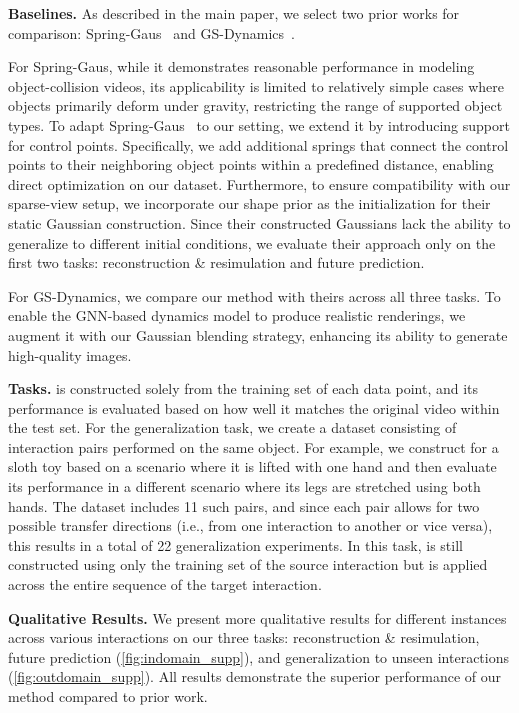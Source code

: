 \documentclass[10pt,twocolumn,letterpaper]{article}
\begin{document}
\textbf{Baselines.} As described in the main paper, we select two prior works for comparison: Spring-Gaus~\cite{zhong2024reconstruction} and GS-Dynamics~\cite{zhang2024dynamic}.  

For Spring-Gaus, while it demonstrates reasonable performance in modeling object-collision videos, its applicability is limited to relatively simple cases where objects primarily deform under gravity, restricting the range of supported object types. To adapt Spring-Gaus~\cite{zhong2024reconstruction} to our setting, we extend it by introducing support for control points. Specifically, we add additional springs that connect the control points to their neighboring object points within a predefined distance, enabling direct optimization on our dataset.  
Furthermore, to ensure compatibility with our sparse-view setup, we incorporate our shape prior as the initialization for their static Gaussian construction. Since their constructed Gaussians lack the ability to generalize to different initial conditions, we evaluate their approach only on the first two tasks: reconstruction \& resimulation and future prediction.

For GS-Dynamics, we compare our method with theirs across all three tasks.  
To enable the GNN-based dynamics model to produce realistic renderings, we augment it with our Gaussian blending strategy, enhancing its ability to generate high-quality images.  

\textbf{Tasks.} \ourabbr is constructed solely from the training set of each data point, and its performance is evaluated based on how well it matches the original video within the test set. For the generalization task, we create a dataset consisting of interaction pairs performed on the same object. For example, we construct \ourabbr for a sloth toy based on a scenario where it is lifted with one hand and then evaluate its performance in a different scenario where its legs are stretched using both hands. The dataset includes 11 such pairs, and since each pair allows for two possible transfer directions (i.e., from one interaction to another or vice versa), this results in a total of 22 generalization experiments. In this task, \ourabbr is still constructed using only the training set of the source interaction but is applied across the entire sequence of the target interaction.



\textbf{Qualitative Results.} We present more qualitative results for different instances across various interactions on our three tasks: reconstruction \& resimulation, future prediction (\cref{fig:indomain_supp}), and generalization to unseen interactions (\cref{fig:outdomain_supp}). All results demonstrate the superior performance of our method compared to prior work.
\end{document}
